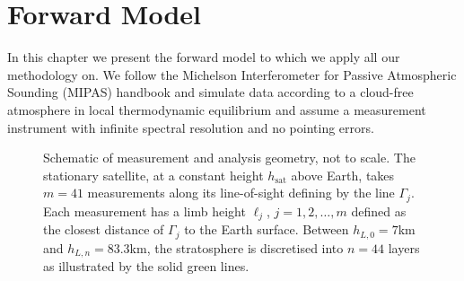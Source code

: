 \chapter{Forward Model}
\label{ch:formodel}

In this chapter we present the forward model to which we apply all our methodology on. We follow the Michelson Interferometer for Passive Atmospheric Sounding (MIPAS) handbook \cite{mipas2000handbook} and simulate data according to a cloud-free atmosphere in local thermodynamic equilibrium and assume a measurement instrument with infinite spectral resolution and no pointing errors.
\begin{figure}[ht!]
	\centering
	
	\caption[Schematic of measurement and analysis geometry.]{Schematic of measurement and analysis geometry, not to scale.
		The stationary satellite, at a constant height $h_\text{sat}$ above Earth, takes $m = 41$ measurements along its line-of-sight defining by the line $\Gamma_j$.
		Each measurement has a limb height $\ell_j$, $j=1,2,\dots,m$ defined as the closest distance of $\Gamma_j$ to the Earth surface.
		Between $h_{L,0} = 7$km and $h_{L,n} = 83.3$km, the stratosphere is discretised into $n =44$ layers as illustrated by the solid green lines.}
	\label{fig:LIMB}
\end{figure}


